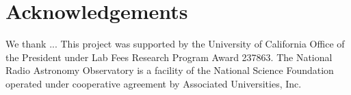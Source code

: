\documentclass{emulateapj}
\begin{document}





\section*{Acknowledgements}
We thank ...
This project was supported by the University of California Office of the President under Lab Fees Research Program Award 237863. The National Radio Astronomy Observatory is a facility of the National Science Foundation operated under cooperative agreement by Associated Universities, Inc. 


\end{document}
